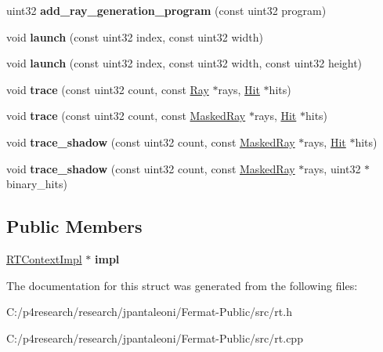 \begin{DoxyCompactItemize}
\item 
\mbox{\label{struct_r_t_context_a54781388d138a0f19d9db32d67d03675}} 
uint32 {\bfseries add\+\_\+ray\+\_\+generation\+\_\+program} (const uint32 program)
\item 
\mbox{\label{struct_r_t_context_af5a07e2f0950d7c7d10dd3b1374133e5}} 
void {\bfseries launch} (const uint32 index, const uint32 width)
\item 
\mbox{\label{struct_r_t_context_a1ea884b9c43b0c752c55ea5a6e9279fd}} 
void {\bfseries launch} (const uint32 index, const uint32 width, const uint32 height)
\item 
\mbox{\label{struct_r_t_context_a18ed5bf258d618471606ddfd8a933962}} 
void {\bfseries trace} (const uint32 count, const \hyperlink{struct_ray}{Ray} $\ast$rays, \hyperlink{struct_hit}{Hit} $\ast$hits)
\item 
\mbox{\label{struct_r_t_context_a199e8462465979acbd31ce4e6f71a55e}} 
void {\bfseries trace} (const uint32 count, const \hyperlink{struct_masked_ray}{Masked\+Ray} $\ast$rays, \hyperlink{struct_hit}{Hit} $\ast$hits)
\item 
\mbox{\label{struct_r_t_context_acf20dae37613f1af995885300d20a7dd}} 
void {\bfseries trace\+\_\+shadow} (const uint32 count, const \hyperlink{struct_masked_ray}{Masked\+Ray} $\ast$rays, \hyperlink{struct_hit}{Hit} $\ast$hits)
\item 
\mbox{\label{struct_r_t_context_ac6a20522a8792f6e006aad254a5df6db}} 
void {\bfseries trace\+\_\+shadow} (const uint32 count, const \hyperlink{struct_masked_ray}{Masked\+Ray} $\ast$rays, uint32 $\ast$binary\+\_\+hits)
\end{DoxyCompactItemize}
\subsection*{Public Members}
\begin{DoxyCompactItemize}
\item 
\mbox{\label{struct_r_t_context_a3f74695ea24d6af162ae2a2802d255e3}} 
\hyperlink{struct_r_t_context_impl}{R\+T\+Context\+Impl} $\ast$ {\bfseries impl}
\end{DoxyCompactItemize}


The documentation for this struct was generated from the following files\+:\begin{DoxyCompactItemize}
\item 
C\+:/p4research/research/jpantaleoni/\+Fermat-\/\+Public/src/rt.\+h\item 
C\+:/p4research/research/jpantaleoni/\+Fermat-\/\+Public/src/rt.\+cpp\end{DoxyCompactItemize}
